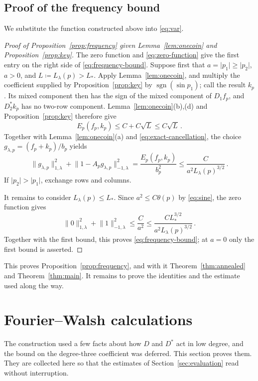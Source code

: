 \documentclass[11pt]{amsart}
\theoremstyle{plain}
\theoremstyle{definition}
\newcommand{\1}{\mathbf 1}
\newcommand{\norm}[1]{\lVert #1\rVert}
\newcommand{\abs}[1]{\lvert #1\rvert}
\newcommand{\sgn}{\operatorname{sgn}}
\newcommand{\Hminus}[1]{\norm{#1}_{-1,\lambda}}
\newcommand{\Hplus}[1]{\norm{#1}_{1,\lambda}}
\begin{document}
\subsection{Proof of the frequency bound}\label{sec:fixed-frequency}

We substitute the function constructed above into \eqref{eq:var}.

\begin{proof}[Proof of Proposition~\ref{prop:frequency} given Lemma~\ref{lem:onecoin} and Proposition~\ref{prop:key}]
The zero function and \eqref{eq:zero-function} give the first entry on the
right side of \eqref{eq:frequency-bound}.  Suppose first that
$a=\abs{p_1}\geq\abs{p_2}$, $a>0$, and
$L\coloneqq L_\lambda(p)>L_*$.  Apply Lemma~\ref{lem:onecoin}, and multiply
the coefficient supplied by Proposition~\ref{prop:key} by
$\sgn(\sin p_1)$; call the result $k_p$.  Its mixed component then has the
sign of the mixed component of $D_1f_p$, and $D_2^*k_p$ has no two-row
component.
Lemma~\ref{lem:onecoin}\textup{(b),(d)} and
Proposition~\ref{prop:key} therefore give
\[
  E_p(f_p,k_p)\leq C+C\sqrt L\leq C\sqrt L\, .
\]
Together with Lemma~\ref{lem:onecoin}\textup{(a)} and
\eqref{eq:exact-cancellation}, the choice
$g_{\lambda,p}=(f_p+k_p)/b_p$ yields
\[
  \Hplus{g_{\lambda,p}}^2+\Hminus{1-A_pg_{\lambda,p}}^2
  =\frac{E_p(f_p,k_p)}{b_p^2}
  \leq\frac{C}{a^2L_\lambda(p)^{3/2}}\, .
\]
If $\abs{p_2}>\abs{p_1}$, exchange rows and columns.

It remains to consider $L_\lambda(p)\leq L_*$.  Since
$a^2\leq C\theta(p)$ by \eqref{eq:sine}, the zero function gives
\[
 \Hplus0^2+\Hminus1^2\leq\frac{C}{a^2}
 \leq\frac{CL_*^{3/2}}{a^2L_\lambda(p)^{3/2}}\, .
\]
Together with the first bound, this proves \eqref{eq:frequency-bound}; at $a=0$
only the first bound is asserted.
\end{proof}

This proves Proposition~\ref{prop:frequency}, and with it
Theorem~\ref{thm:annealed} and Theorem~\ref{thm:main}.  It remains to prove
the identities and the estimate used along the way.

\section{Fourier--Walsh calculations}\label{sec:calculations}

The construction used a few facts about how $D$ and $D^*$ act in low degree,
and the bound on the degree-three coefficient was deferred.  This section
proves them.  They are collected here so that the estimates of
Section~\ref{sec:evaluation} read without interruption.
\end{document}
